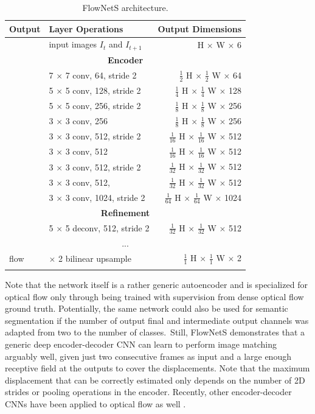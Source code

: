 {
\begin{longtable}{llr}
\toprule
\textbf{Output} & \textbf{Layer Operations} & \textbf{Output Dimensions} \\
\midrule\midrule
 & input images $I_t$ and $I_{t+1}$ & H $\times$ W $\times$ 6 \\
\midrule
\multicolumn{3}{c}{\textbf{Encoder}}\\
\midrule
& 7 $\times$ 7 conv, 64, stride 2 & $\tfrac{1}{2}$ H $\times$ $\tfrac{1}{2}$ W $\times$ 64 \\
& 5 $\times$ 5 conv, 128, stride 2 & $\tfrac{1}{4}$ H $\times$ $\tfrac{1}{4}$ W $\times$ 128 \\
& 5 $\times$ 5 conv, 256, stride 2 & $\tfrac{1}{8}$ H $\times$ $\tfrac{1}{8}$ W $\times$ 256 \\
& 3 $\times$ 3 conv, 256 & $\tfrac{1}{8}$ H $\times$ $\tfrac{1}{8}$ W $\times$ 256 \\
& 3 $\times$ 3 conv, 512, stride 2 & $\tfrac{1}{16}$ H $\times$ $\tfrac{1}{16}$ W $\times$ 512 \\
& 3 $\times$ 3 conv, 512 & $\tfrac{1}{16}$ H $\times$ $\tfrac{1}{16}$ W $\times$ 512 \\
& 3 $\times$ 3 conv, 512, stride 2 & $\tfrac{1}{32}$ H $\times$ $\tfrac{1}{32}$ W $\times$ 512 \\
& 3 $\times$ 3 conv, 512, & $\tfrac{1}{32}$ H $\times$ $\tfrac{1}{32}$ W $\times$ 512 \\
& 3 $\times$ 3 conv, 1024, stride 2 & $\tfrac{1}{64}$ H $\times$ $\tfrac{1}{64}$ W $\times$ 1024 \\
\midrule
\multicolumn{3}{c}{\textbf{Refinement}}\\
& 5 $\times$ 5 deconv, 512, stride 2 & $\tfrac{1}{32}$ H $\times$ $\tfrac{1}{32}$ W $\times$ 512 \\
\multicolumn{3}{c}{...}\\
\midrule
flow & $\times$ 2 bilinear upsample & $\tfrac{1}{1}$ H $\times$ $\tfrac{1}{1}$ W $\times$ 2 \\
\bottomrule

\caption {
FlowNetS \cite{FlowNet} architecture.
}
\label{table:flownets}
\end{longtable}


}

Note that the network itself is a rather generic autoencoder and is specialized for optical flow only through being trained
with supervision from dense optical flow ground truth.
Potentially, the same network could also be used for semantic segmentation if
the number of output final and intermediate output channels was adapted from two to the number of classes.\
Still, FlowNetS demonstrates that a generic deep encoder-decoder CNN can learn to perform image matching arguably well,
given just two consecutive frames as input and a large enough receptive field at the outputs to cover the displacements.
Note that the maximum displacement that can be correctly estimated only depends on the number of 2D strides or pooling
operations in the encoder.
Recently, other encoder-decoder CNNs have been applied to optical flow as well \cite{DenseNetDenseFlow}.

